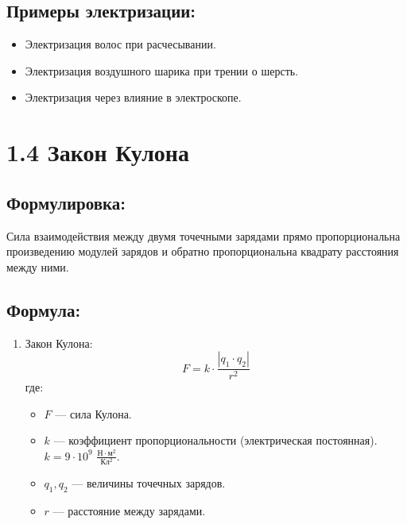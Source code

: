 \documentclass[a4paper,12pt]{article}
\begin{document}
\vspace{-18pt}
\subsection*{Примеры электризации:}
\vspace{-3pt}
\begin{itemize}
  \item Электризация волос при расчесывании.
  \item Электризация воздушного шарика при трении о шерсть.
  \item Электризация через влияние в электроскопе.
\end{itemize}

\newpage

\section*{1.4 Закон Кулона}

\vspace{-9pt}
\subsection*{Формулировка:}
\vspace{-3pt}
Сила взаимодействия между двумя точечными зарядами прямо пропорциональна произведению модулей зарядов и обратно пропорциональна квадрату расстояния между ними.

\vspace{-9pt}
\subsection*{Формула:}
\vspace{-3pt}
\begin{enumerate}[itemsep=0pt, topsep=0pt, parsep=3pt]
  \item Закон Кулона:
  \vspace{-0.05em}
  \vspace{-6pt}
  $$ F = k \cdot \frac{|q_1 \cdot q_2|}{r^2} $$
  где:
  \begin{itemize}
    \item $F$ — сила Кулона.
    \item $k$ — коэффициент пропорциональности (электрическая постоянная). $k = 9 \cdot 10^9$ $\frac{Н \cdot м^2}{Кл^2}$.
    \item $q_1, q_2$ — величины точечных зарядов.
    \item $r$ — расстояние между зарядами.
  \end{itemize}
\end{enumerate}
\end{document}
